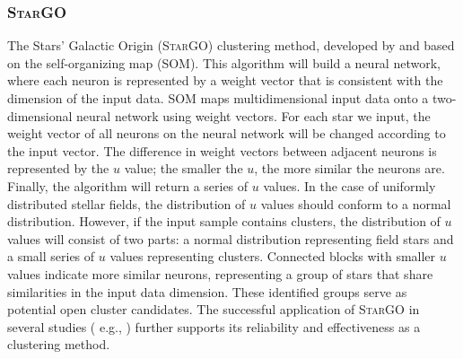 \documentclass{aa} %
\begin{document}
\subsubsection{\textsc{StarGO}} \label{subsec:StarGO}


The Stars' Galactic Origin (\textsc{StarGO}) clustering method, developed by \citet{2018ApJ...863...26Y} and based on the self-organizing map (SOM). 
This algorithm will build a neural network, where each neuron is represented by a weight 
vector that is consistent with the dimension of the input data. SOM maps multidimensional input data onto a two-dimensional neural network using weight vectors. For each star we input, the weight vector of all neurons on the neural network will be changed according to the input vector. The difference in weight vectors between adjacent neurons is represented by the $u$ value; the smaller the $u$, the more similar the neurons are. Finally, the algorithm will return a series of $u$ values. In the case of uniformly distributed stellar fields, the distribution of $u$ values should conform to a normal distribution. However, if the input sample contains clusters, the distribution of $u$ values will consist of two parts: a normal distribution representing field stars and a small series of $u$ values representing clusters. Connected blocks with smaller $u$ values indicate more similar neurons, representing a group of stars that share similarities in the input data dimension. These identified groups serve as potential open cluster candidates. 
The successful application of \textsc{StarGO} in several studies ( e.g., \citealt{2019ApJ...877...12T, 2020ApJ...889...99Z, 2021ApJ...912..162P, 2022ApJ...931..156P}) further supports its reliability and effectiveness as a clustering method.
\end{document}
